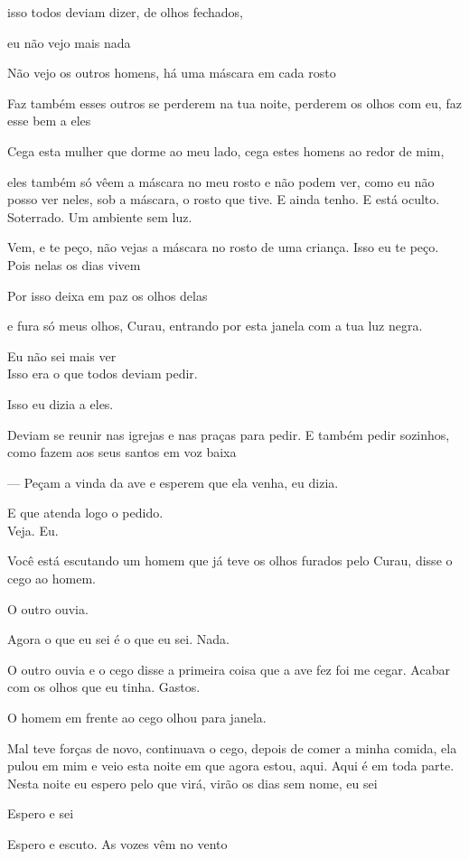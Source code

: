 isso todos deviam dizer, de olhos fechados,

eu não vejo mais nada

Não vejo os outros homens, há uma máscara em cada rosto

Faz também esses outros se perderem na tua noite, perderem os olhos com
eu, faz esse bem a eles

Cega esta mulher que dorme ao meu lado, cega estes homens ao redor de
mim,

eles também só vêem a máscara no meu rosto e não podem ver, como eu não
posso ver neles, sob a máscara, o rosto que tive. E ainda tenho. E está
oculto. Soterrado. Um ambiente sem luz.

Vem, e te peço, não vejas a máscara no rosto de uma criança. Isso eu te
peço. Pois nelas os dias vivem

Por isso deixa em paz os olhos delas

e fura só meus olhos, Curau, entrando por esta janela com a tua luz
negra.

Eu não sei mais ver\\

Isso era o que todos deviam pedir.

Isso eu dizia a eles.

Deviam se reunir nas igrejas e nas praças para pedir. E também pedir
sozinhos, como fazem aos seus santos em voz baixa

--- Peçam a vinda da ave e esperem que ela venha, eu dizia.

E que atenda logo o pedido.\\

Veja. Eu.

Você está escutando um homem que já teve os olhos furados pelo Curau,
disse o cego ao homem.

O outro ouvia.

Agora o que eu sei é o que eu sei. Nada.

O outro ouvia e o cego disse a primeira coisa que a ave fez foi me
cegar. Acabar com os olhos que eu tinha. Gastos.

O homem em frente ao cego olhou para janela.

Mal teve forças de novo, continuava o cego, depois de comer a minha
comida, ela pulou em mim e veio esta noite em que agora estou, aqui.
Aqui é em toda parte. Nesta noite eu espero pelo que virá, virão os dias
sem nome, eu sei

Espero e sei

Espero e escuto. As vozes vêm no vento

